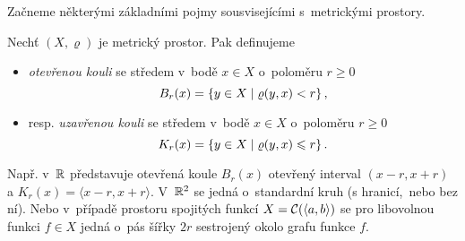 Začneme některými základními pojmy sousvisejícími s~metrickými prostory.
\begin{definition}\label{def:koule-mp}
    Nechť $(X,\varrho)$ je metrický prostor. Pak definujeme
    \begin{itemize}
        \item \emph{otevřenou kouli} se středem v~bodě $x\in X$ o~poloměru $r\geqslant 0$
        \[B_r(x)=\left\{y\in X\mid\varrho(y,x)<r\right\},\]
        \item resp. \emph{uzavřenou kouli} se středem v~bodě $x\in X$ o~poloměru $r\geqslant 0$
        \[K_r(x)=\left\{y\in X\mid\varrho(y,x)\leqslant r\right\}.\]
    \end{itemize}
\end{definition}
Např. v~$\mathbb{R}$ představuje otevřená koule $B_r(x)$ otevřený interval $(x-r,x+r)$ a $K_r(x)=\langle x-r,x+r\rangle$. V~$\mathbb{R}^2$ se jedná o~standardní kruh (s hranicí,~nebo bez ní). Nebo v~případě prostoru spojitých funkcí $X=\mathcal{C}(\langle a,b\rangle)$ se pro libovolnou funkci $f\in X$ jedná o~pás šířky $2r$ sestrojený okolo grafu funkce $f$.

